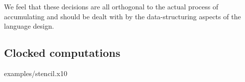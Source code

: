 We feel that these decisions are all orthogonal to the actual process
of accumulating and should be dealt with by the data-structuring
aspects of the language design.

\subsection{Clocked computations}

 {examples/stencil.x10}
